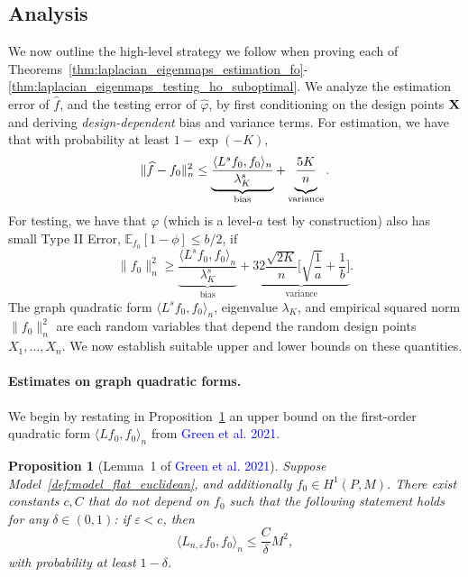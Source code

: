 \documentclass{article}
\newcommand{\1}{\mathbf{1}}
\newcommand{\Ebb}{\mathbb{E}}
\newcommand{\dotp}[2]{\langle #1, #2 \rangle}
\newcommand{\wh}[1]{\widehat{#1}}
\theoremstyle{alden}
\theoremstyle{aldenthm}
\newtheorem{proposition}{Proposition}
\theoremstyle{definition}
\theoremstyle{remark}
\begin{document}
\subsection{Analysis}
\label{subsec:analysis}

We now outline the high-level strategy we follow when proving each of Theorems~\ref{thm:laplacian_eigenmaps_estimation_fo}-\ref{thm:laplacian_eigenmaps_testing_ho_suboptimal}. We analyze the estimation error of $\wh{f}$, and the testing error of $\wh{\varphi}$, by first conditioning on the design points ${\bf X}$ and deriving \emph{design-dependent} bias and variance terms. For estimation, we have that with probability at least $1 - \exp(-K)$,
\begin{equation}
\label{eqn:estimation_biasvariance}
\|\wh{f} - f_0\|_n^2 \leq \underbrace{\frac{\dotp{L^s f_0}{f_0}_n}{\lambda_{K}^s}}_{\textrm{bias}} + \underbrace{\frac{5K}{n} \vphantom{\frac{\dotp{L^s f_0}{f_0}_n}{\lambda_{K}^s}}}_{\textrm{variance}}.
\end{equation}
For testing, we have that $\varphi$ (which is a level-$a$ test by construction) also has small Type II Error, $\Ebb_{f_0}[1 - \phi] \leq b/2$, if 
\begin{equation}
\label{eqn:testing_biasvariance}
\|f_0\|_n^2 \geq  \underbrace{\frac{\dotp{L^s f_0}{f_0}_n}{\lambda_{K}^s}}_{\textrm{bias}} + \underbrace{32\frac{\sqrt{2K}}{n}\biggl[\sqrt{\frac{1}{a}} + \frac{1}{b}\biggr]}_{\textrm{variance}}.
\end{equation}
The graph quadratic form $\dotp{L^s f_0}{f_0}_n$, eigenvalue $\lambda_{K}$, and empirical squared norm $\|f_0\|_n^2$ are each random variables that depend the random design points $X_1,\ldots,X_n$. We now establish suitable upper and lower bounds on these quantities. 

\paragraph{Estimates on graph quadratic forms.}
We begin by restating in Proposition~\ref{prop:graph_seminorm_fo} an upper bound on the first-order quadratic form $\dotp{L f_0}{f_0}_n$ from \textcolor{blue}{Green et al. 2021}.
\begin{proposition}[Lemma~1 of \textcolor{blue}{Green et al. 2021}]
	\label{prop:graph_seminorm_fo}
	Suppose Model~\ref{def:model_flat_euclidean}, and additionally $f_0 \in H^1(P,M)$. There exist constants $c,C$ that do not depend on $f_0$ such that the following statement holds for any $\delta \in (0,1)$: if $\varepsilon < c$, then
	\begin{equation}
	\label{eqn:graph_seminorm_fo}
	\dotp{L_{n,\varepsilon}f_0}{f_0}_n \leq \frac{C}{\delta} M^2,
	\end{equation}
	with probability at least $1 - \delta$.
\end{proposition}
\end{document}
